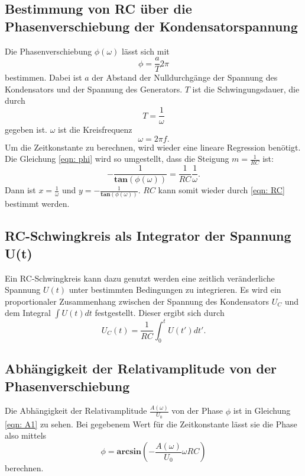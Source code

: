 \subsection{Bestimmung von RC über die Phasenverschiebung der Kondensatorspannung}
Die Phasenverschiebung $\phi(\omega)$ lässt sich mit
\begin{equation}
    \phi = \frac{a}{T}2\pi
\end{equation}
bestimmen. Dabei ist $a$ der Abstand der Nulldurchgänge der Spannung des Kondensators und der Spannung des Generators.
$T$ ist die Schwingungsdauer, die durch
\begin{equation}
    T = \frac{1}{\omega}
\end{equation}
gegeben ist. $\omega$ ist die Kreisfrequenz
\begin{equation*}
    \omega = 2\pi f.
\end{equation*}
Um die Zeitkonstante zu berechnen, wird wieder eine lineare Regression benötigt.
Die Gleichung \eqref{eqn: phi} wird so umgestellt, dass die Steigung $m = \frac{1}{RC}$ ist:
\begin{equation}
    -\frac{1}{\mathbf{tan}(\phi(\omega))} = \frac{1}{RC} \frac{1}{\omega}.
    \label{eqn: linreg3} 
\end{equation}
Dann ist $x= \frac{1}{\omega}$ und $y= -\frac{1}{\mathbf{tan}(\phi(\omega))}$.
$RC$ kann somit wieder durch \eqref{eqn: RC} bestimmt werden.

\subsection{RC-Schwingkreis als Integrator der Spannung U(t)}
Ein RC-Schwingkreis kann dazu genutzt werden eine zeitlich veränderliche Spannung $U(t)$ unter bestimmten Bedingungen zu integrieren. 
Es wird ein proportionaler Zusammenhang zwischen der Spannung des Kondensators $U_{C}$ und dem Integral $\int U(t) dt$ festgestellt. Dieser ergibt sich durch 
\begin{equation}
    U_{C}(t) = \frac{1}{RC} \int_{0}^{t} U(t') dt'.
\end{equation}

\subsection{Abhängigkeit der Relativamplitude von der Phasenverschiebung}
Die Abhängigkeit der Relativamplitude $\frac{A(\omega)}{U_{0}}$ von der Phase $\phi$ ist in
Gleichung \eqref{eqn: A1} zu sehen.
Bei gegebenem Wert für die Zeitkonstante lässt sie die Phase also mittels
\begin{equation}
    \phi = \mathbf{arcsin}(- \frac{A(\omega)}{U_{0}} \omega RC) %
    \label{eqn: phi2}
\end{equation}
berechnen.
